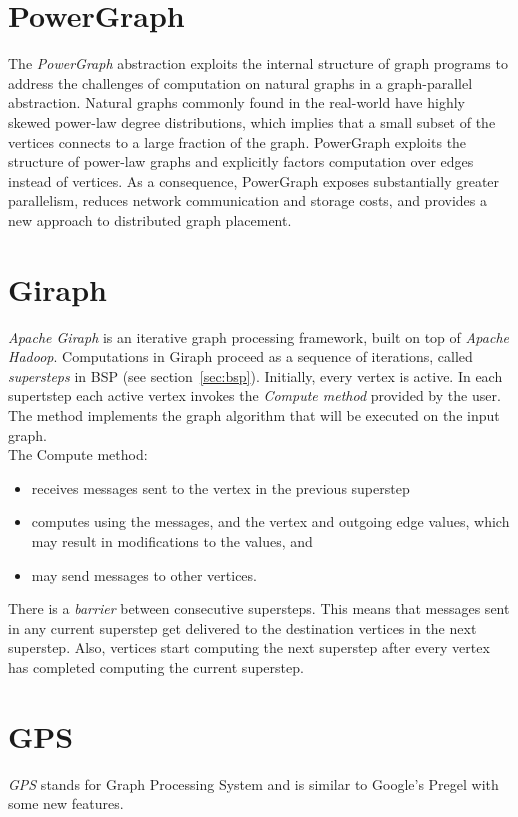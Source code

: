 \documentclass[letterpaper,twocolumn,10pt]{article}
\begin{document}
\section{PowerGraph}
The \textit{PowerGraph} abstraction exploits the internal structure of graph programs to address the challenges of computation on natural graphs in a graph-parallel abstraction. 
Natural graphs commonly found in the real-world have highly skewed power-law degree distributions, which implies that a small subset of the vertices connects to a large fraction of the graph. 
PowerGraph exploits the structure of power-law graphs and explicitly factors computation over edges instead of vertices. As a consequence, PowerGraph exposes substantially greater parallelism, reduces network communication and storage costs, and provides a new approach to distributed graph placement.

\section{Giraph}
\textit{Apache Giraph} is an iterative graph processing framework, built on top of \textit{Apache  Hadoop}.
Computations in Giraph proceed as a sequence of iterations, called \textit{supersteps} in BSP (see section~\ref{sec:bsp}). Initially, every vertex is active. In each supertstep each active vertex invokes the \textit{Compute method} provided by the user. The method implements the graph algorithm that will be executed on the input graph. \\
The Compute method:
\begin{itemize}
\item receives messages sent to the vertex in the previous superstep
\item computes using the messages, and the vertex and outgoing edge values, which may result in modifications to the values, and
\item may send messages to other vertices.
\end{itemize}
There is a \textit{barrier} between consecutive supersteps. This means that messages sent in any current superstep get delivered to the destination vertices in the next superstep. Also, vertices start computing the next superstep after every vertex has completed computing the current superstep.

\section{GPS}
\textit{GPS} stands for Graph Processing System and is similar to Google's Pregel with some new features.
\end{document}
